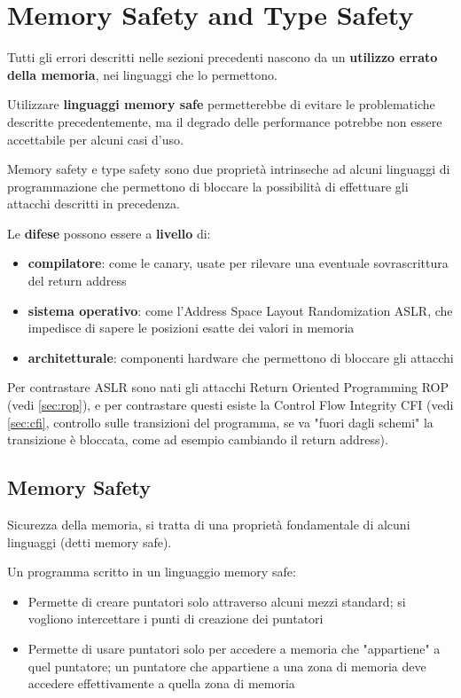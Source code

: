 
\section{Memory Safety and Type Safety}

Tutti gli errori descritti nelle sezioni precedenti nascono da un \textbf{utilizzo errato della memoria}, nei linguaggi che lo permettono. 

Utilizzare \textbf{linguaggi memory safe} permetterebbe di evitare le problematiche descritte precedentemente, ma il degrado delle performance potrebbe non essere accettabile per alcuni casi d'uso.

Memory safety e type safety sono due proprietà intrinseche ad alcuni linguaggi di programmazione che permettono di bloccare la possibilità di effettuare gli attacchi descritti in precedenza.

Le \textbf{difese} possono essere a \textbf{livello} di: 
\begin{itemize}
	\item \textbf{compilatore}: come le canary, usate per rilevare una eventuale sovrascrittura del return address

	\item \textbf{sistema operativo}: come l'Address Space Layout Randomization ASLR, che impedisce di sapere le posizioni esatte dei valori in memoria

	\item \textbf{architetturale}: componenti hardware che permettono di bloccare gli attacchi
\end{itemize}

Per contrastare ASLR sono nati gli attacchi Return Oriented Programming ROP (vedi \ref{sec:rop}), e per contrastare questi esiste la Control Flow Integrity CFI (vedi \ref{sec:cfi}, controllo sulle transizioni del programma, se va "fuori dagli schemi" la transizione è bloccata, come ad esempio cambiando il return address).

\subsection{Memory Safety}

Sicurezza della memoria, si tratta di una proprietà fondamentale di alcuni linguaggi (detti memory safe). 

Un programma scritto in un linguaggio memory safe:
\begin{itemize}
	\item Permette di creare puntatori solo attraverso alcuni mezzi standard; si vogliono intercettare i punti di creazione dei puntatori

	\item Permette di usare puntatori solo per accedere a memoria che "appartiene" a quel puntatore; un puntatore che appartiene a una zona di memoria deve accedere effettivamente a quella zona di memoria
\end{itemize}

